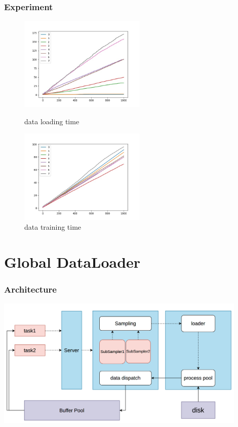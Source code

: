 \documentclass[notheorems, aspectratio=54]{beamer}
\begin{document}
\begin{frame}
    \frametitle{Experiment}
    \begin{figure}[htbp]
    \centering
    \begin{minipage}[t]{0.48\textwidth}
    \centering
    \includegraphics[width=6cm]{global_img_dir/l.jpg}
    \caption{data loading time}
    \end{minipage}
    \begin{minipage}[t]{0.48\textwidth}
    \centering
    \includegraphics[width=6cm]{global_img_dir/b.jpg}
    \caption{data training time}
    \end{minipage}
    \end{figure}
\end{frame}

\section{Global DataLoader}
\begin{frame}
    \frametitle{Architecture}
    \centering
    \includegraphics[width=12cm]{global_img_dir/archi.png}
\end{frame}
\end{document}
